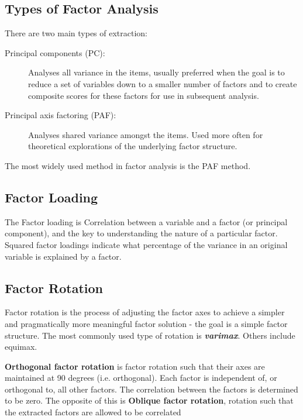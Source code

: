 \subsection{Types of Factor Analysis}
There are two main types of extraction:
\begin{description}
\item[Principal components (PC):] Analyses all variance in the items, usually preferred when the goal is to reduce a set of variables down to a smaller number of factors and to create composite scores for these factors for use in subsequent analysis.
\item[Principal axis factoring (PAF):] Analyses shared variance amongst the items. Used more often for theoretical explorations of the underlying factor structure.
\end{description}
The most widely used method in factor analysis is the PAF method.

\subsection{Factor Loading}
The Factor loading is Correlation between a variable and a factor (or principal component), and the key to understanding the nature of a particular factor. Squared factor loadings indicate what percentage of the variance in an original variable is explained by a factor.

\subsection{Factor Rotation}
Factor rotation is the process of adjusting the factor axes to achieve a simpler and pragmatically more meaningful factor solution - the goal is a simple factor structure. The most commonly used type of rotation is \emph{\textbf{varimax}}. Others include equimax.

\textbf{Orthogonal factor rotation} is factor rotation such that their axes are maintained at 90 degrees (i.e. orthogonal). Each factor is independent of, or orthogonal to, all other factors. The correlation between the factors is determined to be zero. The opposite of this is \textbf{Oblique factor rotation}, rotation such that the extracted factors are allowed to be correlated
